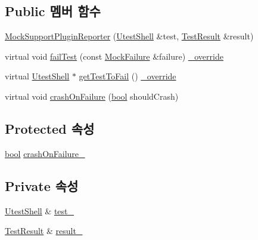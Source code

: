 \subsection*{Public 멤버 함수}
\begin{DoxyCompactItemize}
\item 
\hyperlink{class_mock_support_plugin_reporter_a0071f9d36576965cd680c312a6a86180}{Mock\+Support\+Plugin\+Reporter} (\hyperlink{class_utest_shell}{Utest\+Shell} \&test, \hyperlink{class_test_result}{Test\+Result} \&result)
\item 
virtual void \hyperlink{class_mock_support_plugin_reporter_a362b87ef076bcdf039e8510021fcf5ee}{fail\+Test} (const \hyperlink{class_mock_failure}{Mock\+Failure} \&failure) \hyperlink{_cpp_u_test_config_8h_a049bea15dd750e15869863c94c1efc3b}{\+\_\+override}
\item 
virtual \hyperlink{class_utest_shell}{Utest\+Shell} $\ast$ \hyperlink{class_mock_support_plugin_reporter_a513e89c3b0af8a37fd8b9d6736379793}{get\+Test\+To\+Fail} () \hyperlink{_cpp_u_test_config_8h_a049bea15dd750e15869863c94c1efc3b}{\+\_\+override}
\item 
virtual void \hyperlink{class_mock_failure_reporter_aaeded55857f443ab119b74f1fda402aa}{crash\+On\+Failure} (\hyperlink{avb__gptp_8h_af6a258d8f3ee5206d682d799316314b1}{bool} should\+Crash)
\end{DoxyCompactItemize}
\subsection*{Protected 속성}
\begin{DoxyCompactItemize}
\item 
\hyperlink{avb__gptp_8h_af6a258d8f3ee5206d682d799316314b1}{bool} \hyperlink{class_mock_failure_reporter_a9faf961cbe6687577f4eaae4625bcbea}{crash\+On\+Failure\+\_\+}
\end{DoxyCompactItemize}
\subsection*{Private 속성}
\begin{DoxyCompactItemize}
\item 
\hyperlink{class_utest_shell}{Utest\+Shell} \& \hyperlink{class_mock_support_plugin_reporter_a04705de644c9d275d37d01675cd54a9c}{test\+\_\+}
\item 
\hyperlink{class_test_result}{Test\+Result} \& \hyperlink{class_mock_support_plugin_reporter_a352fd6260eac45bae95c706d39923c2e}{result\+\_\+}
\end{DoxyCompactItemize}


